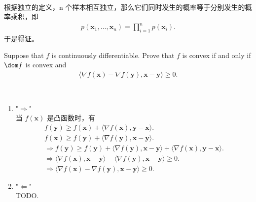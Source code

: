 \begin{solution}
	\heiti
	\ \\
	根据独立的定义，n 个样本相互独立，那么它们同时发生的概率等于分别发生的概率乘积，即
	\begin{align*}
	    p(\mathbf{x}_1,\ldots,\mathbf{x}_n)=\prod_{i=1}^np(\mathbf{x}_i).
	\end{align*}
	于是得证。
\end{solution}
\newpage


\begin{exercise}
	Suppose that $f$ is continuously differentiable. Prove that $f$ is convex if and only if $\dom f$ is convex and
	\begin{align*}
	    \langle \nabla f(\mathbf{x}) - \nabla f(\mathbf{y}) , \mathbf{x} - \mathbf{y} \rangle \geq 0.
	\end{align*}
	
\end{exercise}

\begin{solution}
	\heiti
	\ \\
	\begin{enumerate}
		\item "$\Rightarrow$"\\
			当 $f(\mathbf{x})$ 是凸函数时，有 
			\begin{align*}
				f(\mathbf{y}) \geq f(\mathbf{x}) + \langle \nabla f(\mathbf{x}) , \mathbf{y} - \mathbf{x} \rangle.\\
				f(\mathbf{x}) \geq f(\mathbf{y}) + \langle \nabla f(\mathbf{y}) , \mathbf{x} - \mathbf{y} \rangle.\\
				\Rightarrow f(\mathbf{y}) \geq f(\mathbf{y}) + \langle \nabla f(\mathbf{y}) , \mathbf{x} - \mathbf{y} \rangle + \langle \nabla f(\mathbf{x}) , \mathbf{y} - \mathbf{x} \rangle.\\
				\Rightarrow \langle \nabla f(\mathbf{x}) , \mathbf{x} - \mathbf{y} \rangle - \langle \nabla f(\mathbf{y}) , \mathbf{x} - \mathbf{y} \rangle \geq 0.\\
				\Rightarrow \langle \nabla f(\mathbf{x}) - \nabla f(\mathbf{y}) , \mathbf{x} - \mathbf{y} \rangle \geq 0.
			\end{align*}
		\item "$\Leftarrow$"\\
			TODO.
			
	\end{enumerate}

\end{solution}
